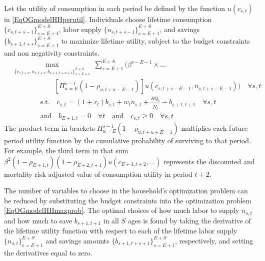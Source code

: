 \documentclass[letterpaper,12pt]{article}
\theoremstyle{definition}
\begin{document}
    Let the utility of consumption in each period be defined by the function $u(c_{s,t})$ in \eqref{EqOGmodelHHperutil}. Individuals choose lifetime consumption $\{c_{s,t+s-1}\}_{s=E+1}^{E+S}$, labor supply $\{n_{s,t+s-1}\}_{s=E+1}^{E+S}$, and savings $\{b_{s+1,t+s}\}_{s=E+1}^{E+S}$ to maximize lifetime utility, subject to the budget constraints and non negativity constraints.
    \begin{equation}\label{EqOGmodelHHmaxprob}
      \begin{split}
        &\max_{\{c_{s,t+v},n_{s,t+v},b_{s+1,t+v+1}\}_{s=E+1}^{E+S}}\: \sum_{s=E+1}^{E+S}\biggl(\beta^{s - E - 1} \times ... \\
        &\qquad\qquad\qquad\left[\Pi_{u = E}^{s-1}(1 - \rho_{u,t + u - E - 1})\right] u(c_{s,t + s - E - 1},n_{s,t + s - E - 1})\biggr) \quad\forall s,t \\
        &\qquad\qquad\text{s.t.}\quad c_{s,t} = (1 + r_t)b_{s,t} + w_{t}n_{s,t}  + \frac{BQ_t}{\tilde{N}_t} - b_{s+1,t+1} \quad\forall s,t \\
        &\qquad\qquad\text{and}\quad b_{E+1,t}=0 \quad\forall t \quad\text{and}\quad c_{s,t}\geq 0 \quad\forall s,t
      \end{split}
    \end{equation}
    The product term in brackets $\Pi_{u = E}^{s-1}(1 - \rho_{u,t+u+E=1})$ multiplies each future period utility function by the cumulative probability of surviving to that period. For example, the third term in that sum $\beta^2(1-\rho_{E+1,t})(1-\rho_{E+2,t+1})u(c_{E+3,t+2},...)$ represents the discounted and mortality risk adjusted value of consumption utility in period $t+2$.

    The number of variables to choose in the household's optimization problem can be reduced by substituting the budget constraints into the optimization problem \eqref{EqOGmodelHHmaxprob}. The optimal choices of how much labor to supply $n_{s,t}$ and how much to save $b_{s+1,t+1}$ in all $S$ ages is found by taking the derivative of the lifetime utility function with respect to each of the lifetime labor supply $\{n_{s,t}\}_{s=E+1}^{E+S}$ and savings amounts $\{b_{s+1,t+s+1}\}_{s=E+1}^{E+S}$, respectively, and setting the derivatives equal to zero.
\end{document}
